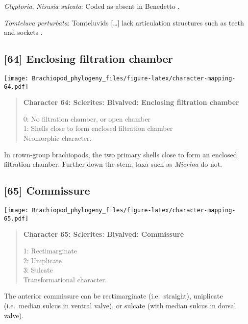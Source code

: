 \documentclass[openany]{book}
\theoremstyle{definition}
\theoremstyle{definition}
\theoremstyle{definition}
\theoremstyle{remark}
\begin{document}
\hypertarget{Glyptoria-coding-63}{}
\emph{Glyptoria}, \emph{Nisusia sulcata}: Coded as absent in Benedetto
\citeyearpar{Benedetto2009iChaniella}.

\hypertarget{Tomteluva_perturbata-coding-63}{}
\emph{Tomteluva perturbata}: Tomteluvids {[}\ldots{}{]} lack
articulation structures such as teeth and sockets
\citep{Streng2016Anew}.

\subsection*{{[}64{]} Enclosing filtration
chamber}\label{enclosing-filtration-chamber}

\texttt{[image: Brachiopod\_phylogeny\_files/figure-latex/character-mapping-64.pdf]}

\begin{quote}
\textbf{Character 64: Sclerites: Bivalved: Enclosing filtration chamber}

0: No filtration chamber, or open chamber\\
1: Shells close to form enclosed filtration chamber\\
Neomorphic character.
\end{quote}

In crown-group brachiopods, the two primary shells close to form an
enclosed filtration chamber. Further down the stem, taxa such as
\emph{Micrina} do not.

\subsection*{{[}65{]} Commissure}\label{commissure}

\texttt{[image: Brachiopod\_phylogeny\_files/figure-latex/character-mapping-65.pdf]}

\begin{quote}
\textbf{Character 65: Sclerites: Bivalved: Commissure}

1: Rectimarginate\\
2: Uniplicate\\
3: Sulcate\\
Transformational character.
\end{quote}

The anterior commissure can be rectimarginate (i.e.~straight),
uniplicate (i.e.~median sulcus in ventral valve), or sulcate (with
median sulcus in dorsal valve).
\end{document}
